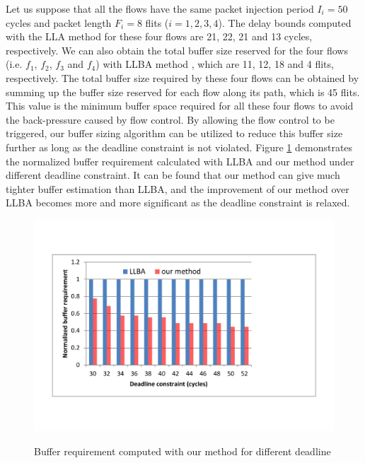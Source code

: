 \documentclass[preprint]{elsarticle}
\begin{document}
Let us suppose that all the flows have the same packet injection period $I_i=50$ cycles and packet length $F_i=8$ flits ($i=1,2,3,4$). The delay bounds computed with the LLA method \cite{73} for these four flows are 21, 22, 21 and 13 cycles, respectively. We can also obtain the total buffer size reserved for the four flows (i.e. $f_1$, $f_2$, $f_3$ and $f_4$) with LLBA method \cite{189}, which are 11, 12, 18 and 4 flits, respectively. The total buffer size required by these four flows can be obtained by summing up the buffer size reserved for each flow along its path, which is 45 flits. This value is the minimum buffer space required for all these four flows to avoid the back-pressure caused by flow control. By allowing the flow control to be triggered, our buffer sizing algorithm can be utilized to reduce this buffer size further as long as the deadline constraint is not violated. Figure \ref{LLBAvsRTC} demonstrates the normalized buffer requirement calculated with LLBA and our method under different deadline constraint. It can be found that our method can give much tighter buffer estimation than LLBA, and the improvement of our method over LLBA becomes more and more significant as the deadline constraint is relaxed.
\begin{figure}
  \centering
  \includegraphics[scale=0.55]{figures/bufopt.pdf}\\
  \caption{Buffer requirement computed with our method for different deadline}\label{LLBAvsRTC}
\end{figure}
\end{document}
